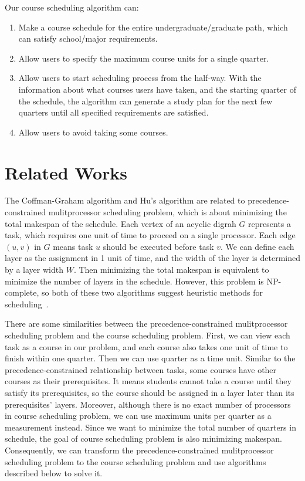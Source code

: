 \documentclass[letterpaper,12pt]{article}
\theoremstyle{definition}
\begin{document}
Our course scheduling algorithm can:
\begin{enumerate}
\item Make a course schedule for the entire undergraduate/graduate path, which can satisfy school/major requirements.
\item Allow users to specify the maximum course units for a single quarter.
\item Allow users to start scheduling process from the half-way. With the information about what courses users have taken, and the starting quarter of the schedule, the algorithm can generate a study plan for the next few quarters until all specified requirements are satisfied. 
\item Allow users to avoid taking some courses.
\end{enumerate}
\section{Related Works}
The Coffman-Graham algorithm and Hu's algorithm are related to precedence-constrained mulitprocessor scheduling problem, which is about minimizing the total makespan of the schedule. Each vertex of an acyclic digrah $G$ represents a task, which requires one unit of time to proceed on a single processor. Each edge $(u,v)$ in $G$ means task $u$ should be executed before task $v$. We can define each layer as the assignment in 1 unit of time, and the width of the layer is determined by a layer width $W$. Then minimizing the total makespan is equivalent to minimize the number of layers in the schedule. However, this problem is NP-complete, so both of these two algorithms suggest heuristic methods for scheduling~\cite{battista_chapter_1998}.

There are some similarities between the precedence-constrained mulitprocessor scheduling problem and the course scheduling problem. First, we can view each task as a course in our problem, and each course also takes one unit of time to finish within one quarter. Then we can use quarter as a time unit. Similar to the precedence-constrained relationship between tasks, some courses have other courses as their prerequisites. It means students cannot take a course until they satisfy its prerequisites, so the course should be assigned in a layer later than its prerequisites' layers. Moreover, although there is no exact number of processors in course scheduling problem, we can use maximum units per quarter as a measurement instead. Since we want to minimize the total number of quarters in schedule, the goal of course scheduling problem is also minimizing makespan. Consequently, we can transform the precedence-constrained mulitprocessor scheduling problem to the course scheduling problem and use algorithms described below to solve it. 
\end{document}
